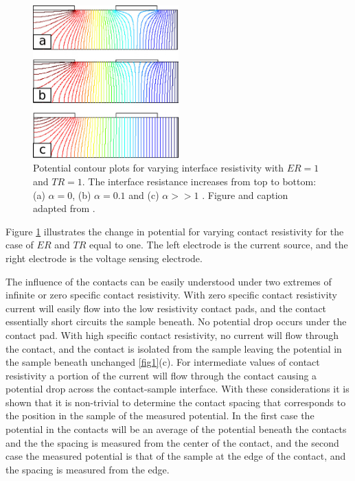 
 
 \begin{figure}[]
  \centering
    \includegraphics[width=0.5\textwidth]{fig/4pp/finite_contact_contour.png}
 \caption{ Potential contour plots for varying interface resistivity with $ER=1$ and $TR= 1$. The interface resistance increases from top to bottom: (a) \hspace{.5mm} $\alpha=0$, (b) \hspace{.5mm} $\alpha=0.1$ and (c) \hspace{.5mm} $\alpha>> 1$ . Figure and caption adapted from \cite{Zimney2007CorrectionStudy}.}
 \label{fig2}
\end{figure}


Figure \ref{fig2} illustrates the change in potential for varying contact resistivity for the case of $ER$ and $TR$ equal to one. The left electrode is the current source, and the right electrode is the voltage sensing electrode. 

The influence of the contacts can be easily understood under two extremes of infinite or zero specific contact resistivity. With zero specific contact resistivity current will easily flow into the low resistivity contact pads, and the contact essentially short circuits the sample beneath. No potential drop occurs under the contact pad. With high specific contact resistivity, no current will flow through the contact, and the contact is isolated from the sample leaving the potential in the sample beneath unchanged \ref{fig1}(c). For intermediate values of contact resistivity a portion of the current will flow through the contact causing a potential drop across the contact-sample interface.
With these considerations it is shown that it is non-trivial  to determine the contact spacing that corresponds to the position in the sample of the measured potential. In the first case the potential in the contacts will be an average of the potential beneath the contacts \cite{Zimney2007CorrectionStudy} %
and the the spacing is measured from the center of the contact, and the second case the measured potential is that of the sample at the edge of the contact, and the spacing is measured from the edge.


